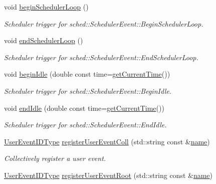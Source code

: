 \begin{DoxyCompactItemize}
void \hyperlink{structvt_1_1trace_1_1_trace_a0e6566503861138843e7dc0a9ba30180}{begin\+Scheduler\+Loop} ()
\begin{DoxyCompactList}\small\item\em Scheduler trigger for {\ttfamily sched\+::\+Scheduler\+Event\+::\+Begin\+Scheduler\+Loop}. \end{DoxyCompactList}\item 
void \hyperlink{structvt_1_1trace_1_1_trace_ad7ee4fc8c75874a524ce7cc1501209fd}{end\+Scheduler\+Loop} ()
\begin{DoxyCompactList}\small\item\em Scheduler trigger for {\ttfamily sched\+::\+Scheduler\+Event\+::\+End\+Scheduler\+Loop}. \end{DoxyCompactList}\item 
void \hyperlink{structvt_1_1trace_1_1_trace_a530af1b7b48cf389744325f6f7e7f05e}{begin\+Idle} (double const time=\hyperlink{structvt_1_1trace_1_1_trace_a04cf6b76b4ced1bc90d246a34c948db5}{get\+Current\+Time}())
\begin{DoxyCompactList}\small\item\em Scheduler trigger for {\ttfamily sched\+::\+Scheduler\+Event\+::\+Begin\+Idle}. \end{DoxyCompactList}\item 
void \hyperlink{structvt_1_1trace_1_1_trace_a0262f4025460c9d61cac60420e75ef77}{end\+Idle} (double const time=\hyperlink{structvt_1_1trace_1_1_trace_a04cf6b76b4ced1bc90d246a34c948db5}{get\+Current\+Time}())
\begin{DoxyCompactList}\small\item\em Scheduler trigger for {\ttfamily sched\+::\+Scheduler\+Event\+::\+End\+Idle}. \end{DoxyCompactList}\item 
\hyperlink{namespacevt_1_1trace_a5908920d051c144c89f17c69ed262350}{User\+Event\+I\+D\+Type} \hyperlink{structvt_1_1trace_1_1_trace_a9a106f7f39e605745994d20bb526f8cf}{register\+User\+Event\+Coll} (std\+::string const \&\hyperlink{structvt_1_1trace_1_1_trace_aaae4bbf6d009229a5c8b9db67a127942}{name})
\begin{DoxyCompactList}\small\item\em Collectively register a user event. \end{DoxyCompactList}\item 
\hyperlink{namespacevt_1_1trace_a5908920d051c144c89f17c69ed262350}{User\+Event\+I\+D\+Type} \hyperlink{structvt_1_1trace_1_1_trace_a99fcca49a5506c3ee5cda67e541e37cc}{register\+User\+Event\+Root} (std\+::string const \&\hyperlink{structvt_1_1trace_1_1_trace_aaae4bbf6d009229a5c8b9db67a127942}{name})

\end{DoxyCompactItemize}
